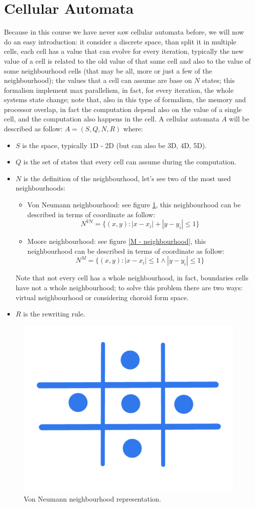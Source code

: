 \documentclass[12pt,a4paper]{report}
\begin{document}
\section{Cellular Automata} Because in this course we have never saw cellular automata before, we will now do an easy introduction: it consider a discrete space, than split it in multiple cells, each cell has a value that can evolve for every iteration, typically the new value of a cell is related to the old value of that same cell and also to the value of some neighbourhood cells (that may be all, more or just a few of the neighbourhood); the values that a cell can assume are base on $N$ states; this formalism implement max parallelism, in fact,  for every iteration, the whole systems state change; note that, also in this type of formalism, the memory and processor overlap, in fact the computation depend also on the value of a single cell, and the computation also happens in the cell. A cellular automata $A$ will be described as follow: $ A = (S, Q, N, R) $ where:
\begin{itemize}
\item $S$ is the space, typically 1D - 2D (but can also be 3D, 4D, 5D).
\item $Q$ is the set of states that every cell can assume during the computation.
\item $N$ is the definition of the neighbourhood, let's see two of the most used neighbourhoods:
\begin{itemize}
\item Von Neumann neighbourhood: see figure \ref{VN - neighbourhood}, this neighbourhood can be described in terms of coordinate as follow: $$ N^{VN} = \lbrace (x, y) : |x - x_{i}| + |y - y_{i}| \leq 1 \rbrace $$
\item Moore neighbourhood:  see figure \ref{M - neighbourhood}, this neighbourhood can be described in terms of coordinate as follow: $$ N^{M} = \lbrace (x, y) : |x - x_{i}| \leq 1 \wedge |y - y_{i}| \leq 1 \rbrace $$
\end{itemize}
Note that not every cell has a whole neighbourhood, in fact, boundaries cells have not a whole neighbourhood; to solve this problem there are two ways: virtual neighbourhood or considering choroid form space.
\item $R$ is the rewriting rule.
\end{itemize}
\begin{figure}[h]
	\centering
	\includegraphics[width=0.3\linewidth]{img/VN - neighbourhood}
	\caption{Von Neumann neighbourhood representation.}
	\label{VN - neighbourhood}
\end{figure}
\end{document}
